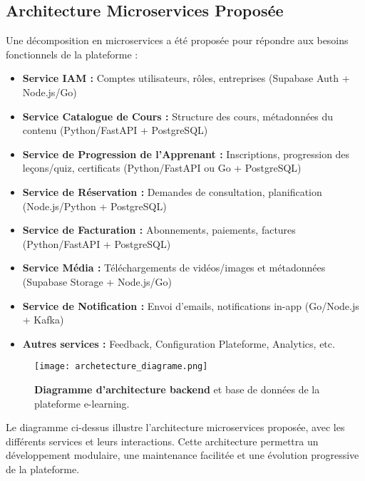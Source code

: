 \subsection{Architecture Microservices Proposée}
Une décomposition en microservices a été proposée pour répondre aux besoins fonctionnels de la plateforme :
\begin{itemize}
  \item \textbf{Service IAM :} Comptes utilisateurs, rôles, entreprises (Supabase Auth + Node.js/Go)
  \item \textbf{Service Catalogue de Cours :} Structure des cours, métadonnées du contenu (Python/FastAPI + PostgreSQL)
  \item \textbf{Service de Progression de l'Apprenant :} Inscriptions, progression des leçons/quiz, certificats (Python/FastAPI ou Go + PostgreSQL)
  \item \textbf{Service de Réservation :} Demandes de consultation, planification (Node.js/Python + PostgreSQL)
  \item \textbf{Service de Facturation :} Abonnements, paiements, factures (Python/FastAPI + PostgreSQL)
  \item \textbf{Service Média :} Téléchargements de vidéos/images et métadonnées (Supabase Storage + Node.js/Go)
  \item \textbf{Service de Notification :} Envoi d'emails, notifications in-app (Go/Node.js + Kafka)
  \item \textbf{Autres services :} Feedback, Configuration Plateforme, Analytics, etc.
\end{itemize}

\begin{figure}[h!]
  \centering
  \texttt{[image: archetecture\_diagrame.png]}
  \caption{\textbf{Diagramme d'architecture backend} et base de données de la plateforme e-learning.}
  \label{fig:architecture_diagram}
\end{figure}

Le diagramme ci-dessus illustre l'architecture microservices proposée, avec les différents services et leurs interactions. Cette architecture permettra un développement modulaire, une maintenance facilitée et une évolution progressive de la plateforme.

